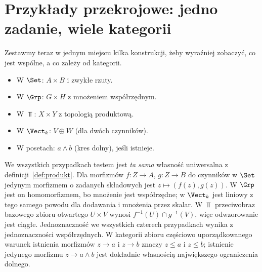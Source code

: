 \section{Przykłady przekrojowe: jedno zadanie, wiele kategorii}\label{sec:przekrojowe}

Zestawmy teraz w jednym miejscu kilka konstrukcji, żeby wyraźniej zobaczyć, co jest wspólne, a co zależy od kategorii.

\begin{przyklad}\label{cat:ex:cross-products}
\leavevmode\par\noindent
\begin{itemize}
\item W $\Set$: $A\times B$ i zwykłe rzuty.
\item W $\Grp$: $G\times H$ z mnożeniem współrzędnym.
\item W $\Top$: $X\times Y$ z topologią produktową.
\item W $\Vect_k$: $V\oplus W$ (dla dwóch czynników).
\item W posetach: $a\wedge b$ (kres dolny), jeśli istnieje.
\end{itemize}
We wszystkich przypadkach testem jest \emph{ta sama} własność uniwersalna z definicji~\ref{def:produkt}. Dla morfizmów $f:Z\to A$, $g:Z\to B$ do czynników w $\Set$ jedynym morfizmem o zadanych składowych jest $z\mapsto(f(z),g(z))$. W $\Grp$ jest on homomorfizmem, bo mnożenie jest współrzędne; w $\Vect_k$ jest liniowy z tego samego powodu dla dodawania i mnożenia przez skalar. W $\Top$ przeciwobraz bazowego zbioru otwartego $U\times V$ wynosi $f^{-1}(U)\cap g^{-1}(V)$, więc odwzorowanie jest ciągłe. Jednoznaczność we wszystkich czterech przypadkach wynika z jednoznaczności współrzędnych. W kategorii zbioru częściowo uporządkowanego warunek istnienia morfizmów $z\to a$ i $z\to b$ znaczy $z\leq a$ i $z\leq b$; istnienie jedynego morfizmu $z\to a\wedge b$ jest dokładnie własnością największego ograniczenia dolnego.
\end{przyklad}

